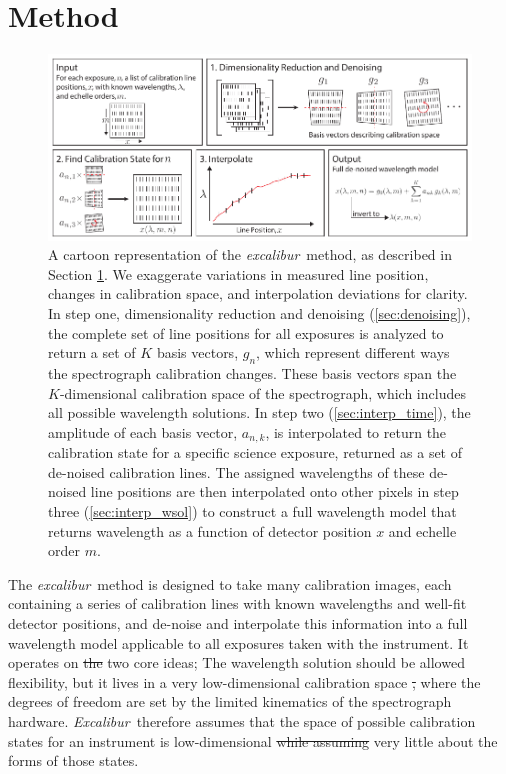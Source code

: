 \documentclass[twocolumn,table,xcolor,trackchanges]{aastex63} %
\newcommand{\project}[1]{\textsl{#1}}
\newcommand{\name}{\project{excalibur}}
\newcommand{\Name}{\project{Excalibur}}
\providecommand{\DIFadd}[1]{{\protect\color{blue}\uwave{#1}}} %
\providecommand{\DIFdel}[1]{{\protect\color{red}\sout{#1}}}                      %
\providecommand{\DIFaddbegin}{} %
\providecommand{\DIFaddend}{} %
\providecommand{\DIFdelbegin}{} %
\providecommand{\DIFdelend}{} %
\begin{document}
\section{Method} \label{sec:method}
\begin{figure}[t]
\centering
\includegraphics[width=\textwidth]{Figures/methodCartoon.pdf}
\caption{A cartoon representation of the \name\ method, as described in Section \ref{sec:method}.  We exaggerate variations in measured line position, changes in calibration space, and interpolation deviations for clarity.  In step one, dimensionality reduction and denoising (\textsection \ref{sec:denoising}), the complete set of line positions for all exposures is analyzed to return a set of $K$ basis vectors, $g_n$, which represent different ways the spectrograph calibration changes.  These basis vectors span the $K$-dimensional calibration space of the spectrograph, which includes all possible wavelength solutions.  In step two (\textsection \ref{sec:interp_time}), the amplitude of each basis vector, $a_{n,k}$, is interpolated to return the calibration state for a specific science exposure, returned as a set of de-noised calibration lines.  The assigned wavelengths of these de-noised line positions are then interpolated onto other pixels in step three (\textsection \ref{sec:interp_wsol}) to construct a full wavelength model that returns wavelength as a function of detector position $x$ and echelle order $m$.}
\label{fig:cartoon}
\end{figure} 

The \name\ method is designed to take many calibration images, each containing a series of calibration lines with known wavelengths and well-fit detector positions, and de-noise and interpolate this information into a full wavelength model applicable to all exposures taken with the instrument.  It operates on \DIFdelbegin \DIFdel{the }\DIFdelend two core ideas; The wavelength solution should be allowed flexibility, but it lives in a very low-dimensional calibration space \DIFdelbegin \DIFdel{, }\DIFdelend where the degrees of freedom are set by the limited kinematics of the spectrograph hardware.  \Name\ therefore assumes that the space of possible calibration states for an instrument is low-dimensional \DIFdelbegin \DIFdel{while assuming }\DIFdelend \DIFaddbegin \DIFadd{but assumes }\DIFaddend very little about the forms of those states.
\end{document}
